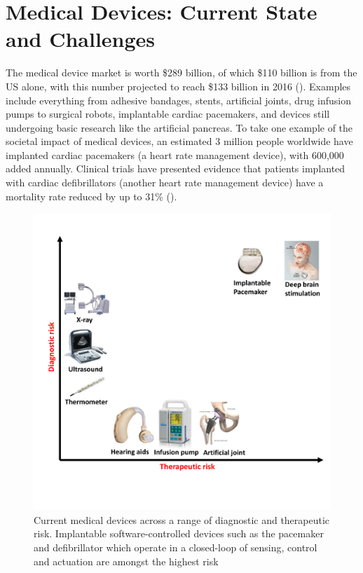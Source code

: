 \chapter{Medical Devices: Current State and Challenges}

The medical device market is worth \$289 billion, of which \$110 billion is from the US alone, with this number projected to reach \$133 billion in 2016 (\cite{market1}).
Examples include everything from adhesive bandages, stents, artificial joints, drug infusion pumps to surgical robots, implantable cardiac pacemakers, and devices still undergoing basic research like the artificial pancreas.
To take one example of the societal impact of medical devices, an estimated 3 million people worldwide have implanted cardiac pacemakers (a heart rate management device), with 600,000 added annually.
Clinical trials have presented evidence that patients implanted with cardiac defibrillators (another heart rate management device) have a mortality rate reduced by up to 31\% (\cite{maditrit}).

\begin{figure}[t]
		\centering
		\includegraphics[width=\textwidth]{figs/devices_new.pdf}
		\caption{\small Current medical devices across a range of diagnostic and therapeutic risk. Implantable software-controlled devices such as the pacemaker and defibrillator which operate in a closed-loop of sensing, control and actuation are amongst the highest risk}
		\label{fig:Cur}
\end{figure}

